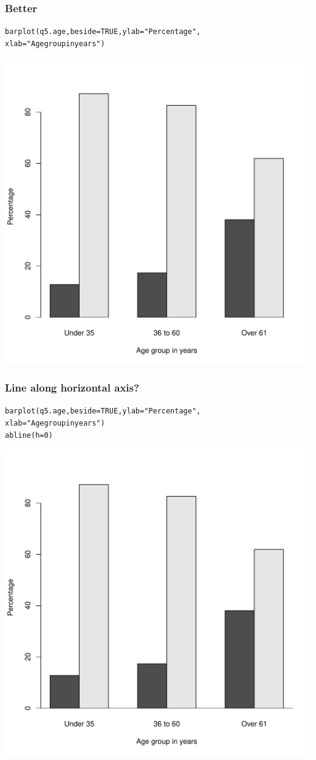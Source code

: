 \documentclass{beamer}\usepackage[]{graphicx}\usepackage[]{color}
\makeatletter
\newcommand{\hlnum}[1]{\textcolor[rgb]{0.533,0,0.133}{#1}}%
\newcommand{\hlstr}[1]{\textcolor[rgb]{0.667,0.267,0}{#1}}%
\newcommand{\hlstd}[1]{\textcolor[rgb]{0,0,0}{#1}}%
\newcommand{\hlkwc}[1]{\textcolor[rgb]{0,0,0.4}{#1}}%
\newcommand{\hlkwd}[1]{\textcolor[rgb]{0,0.267,0.4}{#1}}%
\newenvironment{kframe}{%
 \def\at@end@of@kframe{}%
 \ifinner\ifhmode%
  \def\at@end@of@kframe{\end{minipage}}%
  \begin{minipage}{\columnwidth}%
 \fi\fi%
 \def\FrameCommand##1{\hskip\@totalleftmargin \hskip-\fboxsep
 \colorbox{shadecolor}{##1}\hskip-\fboxsep
     \hskip-\linewidth \hskip-\@totalleftmargin \hskip\columnwidth}%
 \MakeFramed {\advance\hsize-\width
   \@totalleftmargin\z@ \linewidth\hsize
   \@setminipage}}%
 {\par\unskip\endMakeFramed%
 \at@end@of@kframe}
\newenvironment{knitrout}{}{} %
\makeatother
\begin{document}
\begin{frame}[fragile]
  \frametitle{Better}
\begin{knitrout}
\color{fgcolor}\begin{kframe}
\begin{alltt}
\hlkwd{barplot}\hlstd{(q5.age,} \hlkwc{beside} \hlstd{=} \hlnum{TRUE}\hlstd{,} \hlkwc{ylab} \hlstd{=} \hlstr{"Percentage"}\hlstd{,}
        \hlkwc{xlab} \hlstd{=} \hlstr{"Age group in years"}\hlstd{)}
\end{alltt}
\end{kframe}

{\centering \includegraphics[width=0.45\linewidth]{figure/bar2-1} 

}



\end{knitrout}
\end{frame}

\begin{frame}[fragile]
  \frametitle{Line along horizontal axis?}
\begin{knitrout}
\color{fgcolor}\begin{kframe}
\begin{alltt}
\hlkwd{barplot}\hlstd{(q5.age,} \hlkwc{beside} \hlstd{=} \hlnum{TRUE}\hlstd{,} \hlkwc{ylab} \hlstd{=} \hlstr{"Percentage"}\hlstd{,}
        \hlkwc{xlab} \hlstd{=} \hlstr{"Age group in years"}\hlstd{)}
\hlkwd{abline}\hlstd{(}\hlkwc{h} \hlstd{=} \hlnum{0}\hlstd{)}
\end{alltt}
\end{kframe}

{\centering \includegraphics[width=0.45\linewidth]{figure/bar10-1} 

}



\end{knitrout}
\end{frame}
\end{document}
